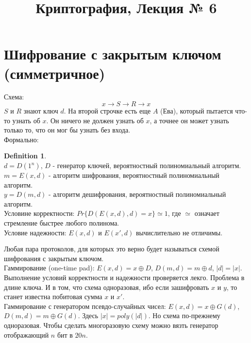 \documentclass[a4paper]{article}
\title{Криптография, Лекция № 6}
\theoremstyle{definition}
\newtheorem{definition}{Definition}
\theoremstyle{plain}
\begin{document}
\maketitle

\section{Шифрование с закрытым ключом~\\(симметричное)}

Схема:
$$
	x \longrightarrow S \longrightarrow R \longrightarrow x
$$
$S$ и $R$ знают ключ $d$. На второй строчке есть еще $A$ (Ева), который пытается что-то узнать об $x$. Он ничего
не должен узнать об $x$, а точнее он может узнать только то, что он мог бы узнать без входа.~\\

\noindent Формально:
\begin{definition}~\\
	$d = D(1^n)$, $D$ - генератор ключей, вероятностный полиномиальный алгоритм.~\\
	$m = E(x, d)$ - алгоритм шифрования, вероятностный полиномиальный алгоритм.~\\
	$y = D(m, d)$ - алгоритм дешифрования, вероятностный полиномиальный алгоритм.~\\
	Условине корректности: $Pr\{D(E(x, d), d) = x\} \simeq 1$, где $\simeq$ означает стремление
	быстрее любого полинома.~\\
	Условие надежности: $E(x, d)$ и $E(x', d)$ вычислительно не отличимы.
\end{definition}

\noindent Любая пара протоколов, для которых это верно будет называться схемой шифрования с закрытым ключом.~\\

\noindent Гаммирование (one-time pad): $E(x, d) = x \oplus D$, $D(m, d) = m \oplus d$, $|d| = |x|$.
Выполнение условий корректности и надежности проверяется лекго. Проблема в длине ключа. И в том, что схема
одноразовая, ибо если зашифровать $x$ и $y$, то станет известна побитовая сумма $x$ и $x'$.~\\

\noindent Гаммирование с генератором псевдо-случайных чисел: $E(x, d) = x \oplus G(d)$, $D(m, d) = m \oplus G(d)$. Здесь $|x| = poly(|d|)$. Но схема по-прежнему одноразовая.
Чтобы сделать многоразовую схему можно вязть генератор отображающий $n$ бит в $20n$.~\\
\end{document}
